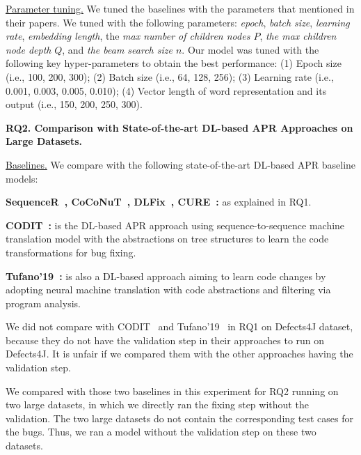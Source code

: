 \underline{Parameter tuning.} We tuned the baselines with the
parameters that mentioned in their papers. We tuned \tool with the
following parameters: {\em epoch}, {\em batch size}, {\em learning
  rate}, {\em embedding length}, the {\em max number of children nodes
  $P$}, {\em the max children node depth} $Q$, and {\em the beam
  search size $n$}. Our model was tuned with the following key
hyper-parameters to obtain the best performance: (1) Epoch size (i.e.,
100, 200, 300); (2) Batch size (i.e., 64, 128, 256); (3) Learning rate
(i.e., 0.001, 0.003, 0.005, 0.010); (4) Vector length of word
representation and its output (i.e., 150, 200, 250, 300).

{\bf RQ2. Comparison with State-of-the-art DL-based APR Approaches on
  Large Datasets.}

\underline{Baselines.} We compare {\tool} with the following state-of-the-art DL-based APR baseline models:

{\bf SequenceR~\cite{chen2018sequencer}, CoCoNuT~\cite{lutellier2020coconut}, DLFix~\cite{icse20}, CURE~\cite{cure-icse21}:} as explained in RQ1.

{\bf CODIT~\cite{chakrabortycodit}:} is the DL-based APR approach using
sequence-to-sequence machine translation model with the abstractions on tree
structures to learn the code transformations for bug fixing.

{\bf Tufano'19~\cite{tufano2019learning}:} is also a DL-based approach
aiming to learn code changes by adopting neural machine translation
with code abstractions and filtering via program analysis.

We did not compare with CODIT~\cite{chakrabortycodit} and
Tufano'19~\cite{tufano2019learning} in RQ1 on Defects4J dataset,
because they do not have the validation step in their approaches to
run on Defects4J. It is unfair if we compared them with the other
approaches having the validation step.

We compared {\tool} with those two baselines in this experiment for
RQ2 running on two large datasets, in which we directly ran the fixing
step without the validation. The two large datasets do not contain the
corresponding test cases for the bugs. Thus, we ran a model
without the validation step on these two datasets.


